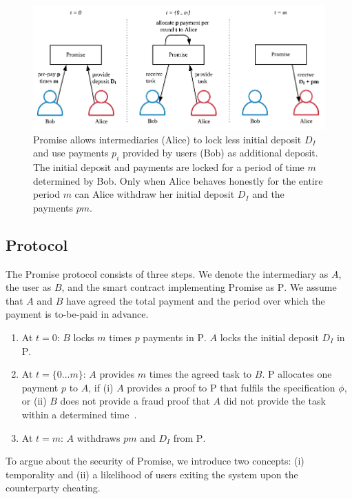 \documentclass[runningheads]{llncs}
\newcommand{\sys}{Promise\xspace}
\begin{document}
\begin{figure}[t!]
    \centering
    \includegraphics[width=\textwidth]{figures/protocol.pdf}
    \caption{\sys allows intermediaries (Alice) to lock less initial deposit $D_I$ and use payments $p_i$ provided by users (Bob) as additional deposit. The initial deposit and payments are locked for a period of time $m$ determined by Bob. Only when Alice behaves honestly for the entire period $m$ can Alice withdraw her initial deposit $D_I$ and the payments $pm$.}
    \label{fig:promise}
\end{figure}

\subsection{Protocol}

The \sys protocol consists of three steps.
We denote the intermediary as $A$, the user as $B$, and the smart contract implementing \sys as $\mathrm{P}$.
We assume that $A$ and $B$ have agreed the total payment and the period over which the payment is to-be-paid in advance.

\begin{enumerate}
    \item At $t=0$: $B$ locks $m$ times $p$ payments in $\mathrm{P}$. $A$ locks the initial deposit $D_I$ in $\mathrm{P}$.
    \item At $t=\{0 ... m\}$: $A$ provides $m$ times the agreed task to $B$. $\mathrm{P}$ allocates one payment $p$ to $A$, if (i) $A$ provides a proof to $\mathrm{P}$ that fulfils the specification $\phi$, or (ii) $B$ does not provide a fraud proof that $A$ did not provide the task within a determined time~\cite{Al-Bassam2018}.
    \item At $t=m$: $A$ withdraws $pm$ and $D_I$ from $\mathrm{P}$.
\end{enumerate}

To argue about the security of \sys, we introduce two concepts: (i) temporality and (ii) a likelihood of users exiting the system upon the counterparty cheating.
\end{document}
